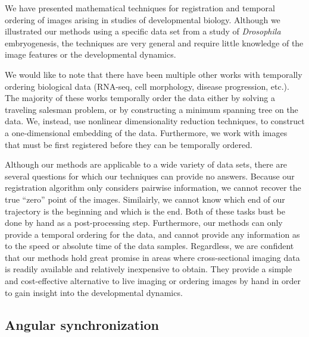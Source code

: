 \documentclass{pnastwo}
\begin{document}
\begin{article}
We have presented mathematical techniques for registration and temporal ordering of images arising in studies of developmental biology.
%
Although we illustrated our methods using a specific data set from a study of {\em Drosophila} embryogenesis, the techniques are very general and require little knowledge of the image features or the developmental dynamics.

We would like to note that there have been multiple other works with temporally ordering biological data (RNA-seq, cell morphology, disease progression, etc.). 
%
The majority of these works temporally order the data either by solving a traveling salesman problem, or by constructing a minimum spanning tree on the data.
%
We, instead, use nonlinear dimensionality reduction techniques, to construct a one-dimensional embedding of the data.
%
Furthermore, we work with images that must be first registered before they can be temporally ordered.

Although our methods are applicable to a wide variety of data sets, there are several questions for which our techniques can provide no answers.
%
Because our registration algorithm only considers pairwise information, we cannot recover the true ``zero'' point of the images. 
%
Similairly, we cannot know which end of our trajectory is the beginning and which is the end.
%
Both of these tasks bust be done by hand as a post-processing step.
%
Furthermore, our methods can only provide a temporal ordering for the data, and cannot provide any information as to the speed or absolute time of the data samples.
%
Regardless, we are confident that our methods hold great promise in areas where cross-sectional imaging data is readily available and relatively inexpensive to obtain. 
%
They provide a simple and cost-effective alternative to live imaging or ordering images by hand in order to gain insight into the developmental dynamics.





\begin{materials}

\section{Angular synchronization \cite{singer2011angular}}


\end{materials}
\end{article}
\end{document}
